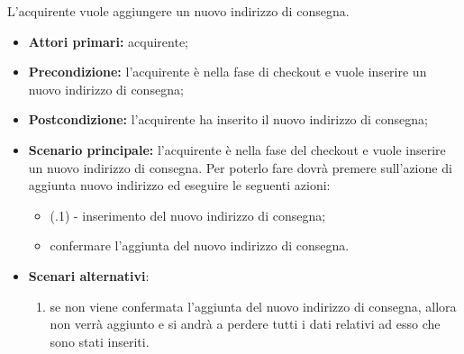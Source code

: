 
L'acquirente vuole aggiungere un nuovo indirizzo di consegna.
\begin{itemize}
    \item \textbf{Attori primari:} acquirente;
    \item \textbf{Precondizione:} l'acquirente è nella fase di checkout e vuole inserire un nuovo indirizzo di consegna;
    \item \textbf{Postcondizione:} l'acquirente ha inserito il nuovo indirizzo di consegna;
    \item \textbf{Scenario principale:} l'acquirente è nella fase del checkout e vuole inserire un nuovo indirizzo di consegna. Per poterlo fare dovrà premere sull'azione di aggiunta nuovo indirizzo ed eseguire le seguenti azioni:
    \begin{itemize}
        \item (.1) - inserimento del nuovo indirizzo di consegna;
        \item confermare l'aggiunta del nuovo indirizzo di consegna.
    \end{itemize}
    \item \textbf{Scenari alternativi}:
    \begin{enumerate}[label=\lett]
        \item se non viene confermata l'aggiunta del nuovo indirizzo di consegna, allora non verrà aggiunto e si andrà a perdere tutti i dati relativi ad esso che sono stati inseriti.
    \end{enumerate}
\end{itemize}

\resetSubUC

